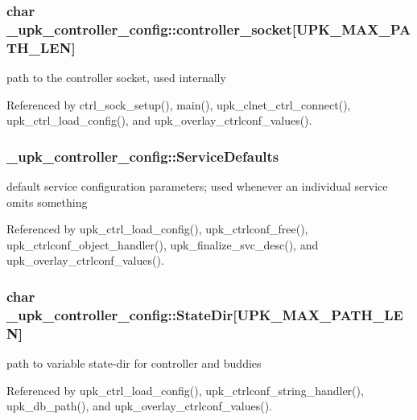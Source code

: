 \subsubsection[{controller\_\-socket}]{\setlength{\rightskip}{0pt plus 5cm}char {\bf \_\-upk\_\-controller\_\-config::controller\_\-socket}[UPK\_\-MAX\_\-PATH\_\-LEN]}\label{struct__upk__controller__config_aed6d21d38958b21cd9ccfbc4815395fd}
path to the controller socket, used internally 

Referenced by ctrl\_\-sock\_\-setup(), main(), upk\_\-clnet\_\-ctrl\_\-connect(), upk\_\-ctrl\_\-load\_\-config(), and upk\_\-overlay\_\-ctrlconf\_\-values().

\subsubsection[{ServiceDefaults}]{ {\bf \_\-upk\_\-controller\_\-config::ServiceDefaults}}\label{struct__upk__controller__config_a31100d724637fed5b3dc4003fbc145c2}
default service configuration parameters; used whenever an individual service omits something 

Referenced by upk\_\-ctrl\_\-load\_\-config(), upk\_\-ctrlconf\_\-free(), upk\_\-ctrlconf\_\-object\_\-handler(), upk\_\-finalize\_\-svc\_\-desc(), and upk\_\-overlay\_\-ctrlconf\_\-values().

\subsubsection[{StateDir}]{\setlength{\rightskip}{0pt plus 5cm}char {\bf \_\-upk\_\-controller\_\-config::StateDir}[UPK\_\-MAX\_\-PATH\_\-LEN]}\label{struct__upk__controller__config_a68ab17a9f788bbdc19c1c575426a564e}
path to variable state-\/dir for controller and buddies 

Referenced by upk\_\-ctrl\_\-load\_\-config(), upk\_\-ctrlconf\_\-string\_\-handler(), upk\_\-db\_\-path(), and upk\_\-overlay\_\-ctrlconf\_\-values().

